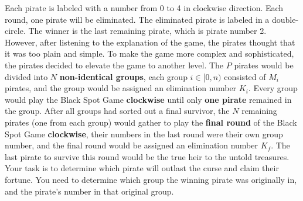 \documentclass[12pt,a4paper]{article}
\begin{document}
\begin{center}
\end{center}

\noindent
Each pirate is labeled with a number from 0 to 4 in clockwise direction. Each round, one pirate will be eliminated. 
The eliminated pirate is labeled in a double-circle. The winner is the last remaining pirate, which is pirate number 2.\\

\noindent
However, after listening to the explanation of the game, the pirates thought that it was too plain and simple.
To make the game more complex and sophisticated, the pirates decided to elevate the game to another level. The \(P\) pirates would be divided into \(N\) \textbf{non-identical groups},
each group \(i \in [0,n)\) consisted of \(M_i\) pirates, and the group would be assigned an elimination number \(K_i\).
Every group would play the Black Spot Game \textbf{clockwise} until only \textbf{one pirate} remained in the group. After all groups had sorted out a final survivor,
the \(N\) remaining pirates (one from each group) would gather to play the \textbf{final round} of the Black Spot Game \textbf{clockwise}, their numbers in the last round were their own group number, and the final round would be assigned an elimination number \(K_f\). The last pirate to survive this round would be the true heir to the untold treasures.
\\
\noindent
Your task is to determine which pirate will outlast the curse and claim their fortune.
You need to determine which group the winning pirate was originally in, and the pirate's number in that original group. 
\end{document}
